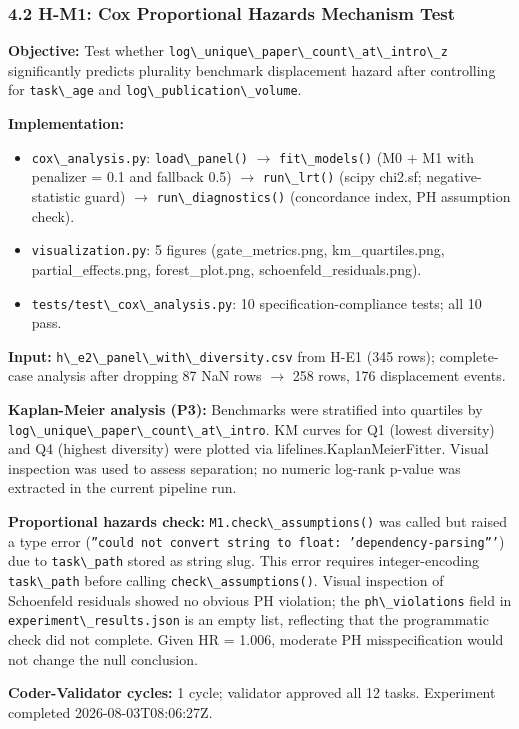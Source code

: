\subsubsection{4.2 H-M1: Cox Proportional Hazards Mechanism Test}

\textbf{Objective:} Test whether \texttt{log\textbackslash \_unique\textbackslash \_paper\textbackslash \_count\textbackslash \_at\textbackslash \_intro\textbackslash \_z} significantly predicts plurality benchmark displacement hazard after controlling for \texttt{task\textbackslash \_age} and \texttt{log\textbackslash \_publication\textbackslash \_volume}.

\textbf{Implementation:}
\begin{itemize}
\item \texttt{cox\textbackslash \_analysis.py}: \texttt{load\textbackslash \_panel()} $\rightarrow$ \texttt{fit\textbackslash \_models()} (M0 + M1 with penalizer = 0.1 and fallback 0.5) $\rightarrow$ \texttt{run\textbackslash \_lrt()} (scipy chi2.sf; negative-statistic guard) $\rightarrow$ \texttt{run\textbackslash \_diagnostics()} (concordance index, PH assumption check).
\item \texttt{visualization.py}: 5 figures (gate\_metrics.png, km\_quartiles.png, partial\_effects.png, forest\_plot.png, schoenfeld\_residuals.png).
\item \texttt{tests/test\textbackslash \_cox\textbackslash \_analysis.py}: 10 specification-compliance tests; all 10 pass.
\end{itemize}

\textbf{Input:} \texttt{h\textbackslash \_e2\textbackslash \_panel\textbackslash \_with\textbackslash \_diversity.csv} from H-E1 (345 rows); complete-case analysis after dropping 87 NaN rows $\rightarrow$ 258 rows, 176 displacement events.

\textbf{Kaplan-Meier analysis (P3):} Benchmarks were stratified into quartiles by \texttt{log\textbackslash \_unique\textbackslash \_paper\textbackslash \_count\textbackslash \_at\textbackslash \_intro}. KM curves for Q1 (lowest diversity) and Q4 (highest diversity) were plotted via lifelines.KaplanMeierFitter. Visual inspection was used to assess separation; no numeric log-rank p-value was extracted in the current pipeline run.

\textbf{Proportional hazards check:} \texttt{M1.check\textbackslash \_assumptions()} was called but raised a type error (\texttt{''could not convert string to float: 'dependency-parsing'''}) due to \texttt{task\textbackslash \_path} stored as string slug. This error requires integer-encoding \texttt{task\textbackslash \_path} before calling \texttt{check\textbackslash \_assumptions()}. Visual inspection of Schoenfeld residuals showed no obvious PH violation; the \texttt{ph\textbackslash \_violations} field in \texttt{experiment\textbackslash \_results.json} is an empty list, reflecting that the programmatic check did not complete. Given HR = 1.006, moderate PH misspecification would not change the null conclusion.

\textbf{Coder-Validator cycles:} 1 cycle; validator approved all 12 tasks. Experiment completed 2026-08-03T08:06:27Z.

